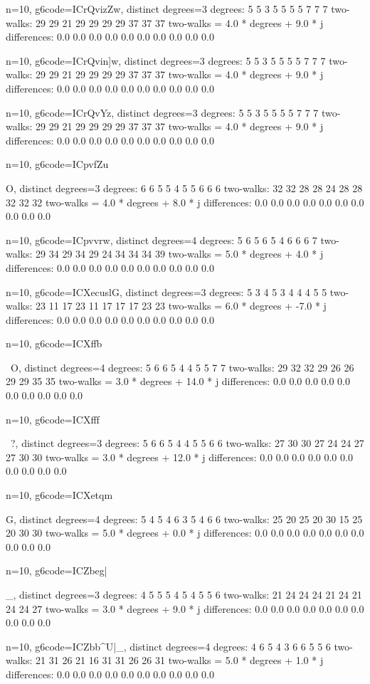 {{{{{{{{{{{{{{{n=10, g6code=ICrQvizZw, distinct degrees=3
degrees: 5 5 3 5 5 5 5 7 7 7 
two-walks: 29 29 21 29 29 29 29 37 37 37 
two-walks = 4.0 * degrees + 9.0 * j
differences: 0.0 0.0 0.0 0.0 0.0 0.0 0.0 0.0 0.0 0.0 

n=10, g6code=ICrQvin]w, distinct degrees=3
degrees: 5 5 3 5 5 5 5 7 7 7 
two-walks: 29 29 21 29 29 29 29 37 37 37 
two-walks = 4.0 * degrees + 9.0 * j
differences: 0.0 0.0 0.0 0.0 0.0 0.0 0.0 0.0 0.0 0.0 

n=10, g6code=ICrQvYz\w, distinct degrees=3
degrees: 5 5 3 5 5 5 5 7 7 7 
two-walks: 29 29 21 29 29 29 29 37 37 37 
two-walks = 4.0 * degrees + 9.0 * j
differences: 0.0 0.0 0.0 0.0 0.0 0.0 0.0 0.0 0.0 0.0 

n=10, g6code=ICpvfZu}O, distinct degrees=3
degrees: 6 6 5 5 4 5 5 6 6 6 
two-walks: 32 32 28 28 24 28 28 32 32 32 
two-walks = 4.0 * degrees + 8.0 * j
differences: 0.0 0.0 0.0 0.0 0.0 0.0 0.0 0.0 0.0 0.0 

n=10, g6code=ICpvvrw\w, distinct degrees=4
degrees: 5 6 5 6 5 4 6 6 6 7 
two-walks: 29 34 29 34 29 24 34 34 34 39 
two-walks = 5.0 * degrees + 4.0 * j
differences: 0.0 0.0 0.0 0.0 0.0 0.0 0.0 0.0 0.0 0.0 

n=10, g6code=ICXecuslG, distinct degrees=3
degrees: 5 3 4 5 3 4 4 4 5 5 
two-walks: 23 11 17 23 11 17 17 17 23 23 
two-walks = 6.0 * degrees + -7.0 * j
differences: 0.0 0.0 0.0 0.0 0.0 0.0 0.0 0.0 0.0 0.0 

n=10, g6code=ICXffb}~O, distinct degrees=4
degrees: 5 6 6 5 4 4 5 5 7 7 
two-walks: 29 32 32 29 26 26 29 29 35 35 
two-walks = 3.0 * degrees + 14.0 * j
differences: 0.0 0.0 0.0 0.0 0.0 0.0 0.0 0.0 0.0 0.0 

n=10, g6code=ICXfff{~?, distinct degrees=3
degrees: 5 6 6 5 4 4 5 5 6 6 
two-walks: 27 30 30 27 24 24 27 27 30 30 
two-walks = 3.0 * degrees + 12.0 * j
differences: 0.0 0.0 0.0 0.0 0.0 0.0 0.0 0.0 0.0 0.0 

n=10, g6code=ICXetqm}G, distinct degrees=4
degrees: 5 4 5 4 6 3 5 4 6 6 
two-walks: 25 20 25 20 30 15 25 20 30 30 
two-walks = 5.0 * degrees + 0.0 * j
differences: 0.0 0.0 0.0 0.0 0.0 0.0 0.0 0.0 0.0 0.0 

n=10, g6code=ICZbeg|}_, distinct degrees=3
degrees: 4 5 5 5 4 5 4 5 5 6 
two-walks: 21 24 24 24 21 24 21 24 24 27 
two-walks = 3.0 * degrees + 9.0 * j
differences: 0.0 0.0 0.0 0.0 0.0 0.0 0.0 0.0 0.0 0.0 

n=10, g6code=ICZbb^U|_, distinct degrees=4
degrees: 4 6 5 4 3 6 6 5 5 6 
two-walks: 21 31 26 21 16 31 31 26 26 31 
two-walks = 5.0 * degrees + 1.0 * j
differences: 0.0 0.0 0.0 0.0 0.0 0.0 0.0 0.0 0.0 0.0 

}}}}}}}}}}}}
